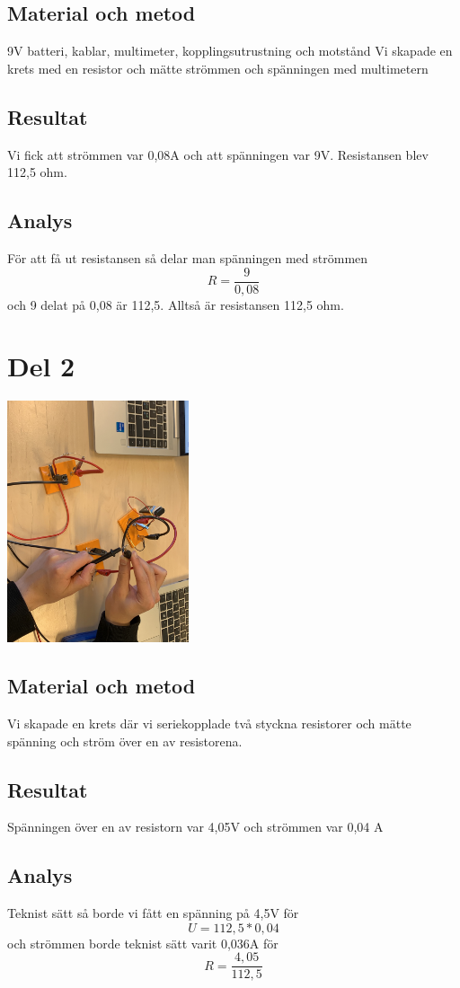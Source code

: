 \documentclass[11p]{article}
\begin{document}
    \subsection{Material och metod}
    9V batteri, kablar,  multimeter, kopplingsutrustning och motstånd
    Vi skapade en krets med en resistor och mätte strömmen och spänningen med multimetern
    \subsection{Resultat}
    Vi fick att strömmen var 0,08A och att spänningen var 9V. Resistansen blev 112,5 ohm.
    \subsection{Analys}
    För att få ut resistansen så delar man spänningen med strömmen
    \begin{equation} R = \frac{9}{0,08}\end{equation}
    och 9 delat på 0,08 är 112,5. Alltså är resistansen 112,5 ohm.
    \section{Del 2}
    \includegraphics[width=0.4\textwidth]{../images/Elbild2.jpg}
    \subsection{Material och metod}
Vi skapade en krets där vi seriekopplade två styckna resistorer och mätte spänning och ström över en av resistorena.
    \subsection{Resultat}
    Spänningen över en av resistorn var 4,05V och strömmen var 0,04 A
    \subsection{Analys}
    Teknist sätt så borde vi fått en spänning på 4,5V för \begin{equation} U = 112,5 * 0,04 \end{equation} och strömmen borde teknist sätt varit 0,036A för \begin{equation} R = \frac{4,05}{112,5}\end{equation}
\end{document}
